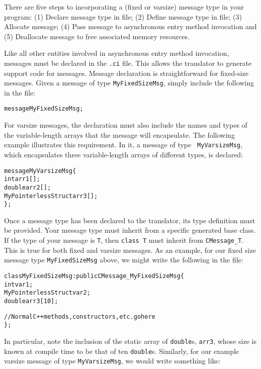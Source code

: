 There are five steps to incorporating a (fixed or varsize) message type in your \charmpp{} program:
(1) Declare message type in  file; (2) Define message type in  file;
(3) Allocate message; (4) Pass message to asynchronous entry method invocation and (5) Deallocate
message to free associated memory resources. 

\medskip
{}
Like all other entities involved in asynchronous entry method invocation, messages
must be declared in the {\tt .ci} file. 
This allows the \charmpp{} translator 
to generate support code for messages. 
Message declaration is straightforward for fixed-size messages. Given a 
message of type {\tt MyFixedSizeMsg}, simply include the following in the  file:

\begin{alltt}
 message MyFixedSizeMsg;
\end{alltt}

For varsize messages, the  declaration must also include the names and
types of the variable-length arrays that the message will encapsulate. The
following example illustrates this requirement. In it, a message of type {\tt
MyVarsizeMsg}, which encapsulates three variable-length arrays of different
types, is declared:

\begin{alltt}
 message MyVarsizeMsg \{
   int arr1[];
   double arr2[];
   MyPointerlessStruct arr3[];
 \};
\end{alltt}

\medskip
{}
Once a message type has been declared to the \charmpp{} translator, its type definition must be provided.
Your message type must inherit from a specific generated base class. If the type of 
your message is {\tt T}, then {\tt class T} must inherit from {\tt CMessage\_T}.
This is true for both fixed and varsize messages.
As an example, for our fixed size message
type {\tt MyFixedSizeMsg} above, we might write the following in the  file:

\begin{alltt}
class MyFixedSizeMsg : public CMessage_MyFixedSizeMsg \{
  int var1;
  MyPointerlessStruct var2;
  double arr3[10];

  // Normal C++ methods, constructors, etc. go here
\};
\end{alltt}

In particular, note the inclusion of the static array of {\tt double}s, {\tt arr3}, whose size
is known at compile time to be that of ten {\tt double}s.
Similarly, for our example varsize message of type {\tt MyVarsizeMsg}, we would write something
like:

